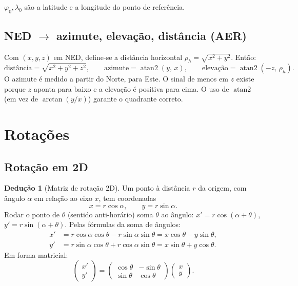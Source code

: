 \documentclass[11pt,a4paper]{article}
\theoremstyle{definition}
\newtheorem{deducao}{Dedução}[section]
\begin{document}
$\varphi_0,\lambda_0$ são a latitude e a longitude do ponto de referência.

\subsection{NED $\rightarrow$ azimute, elevação, distância (AER)}
Com $(x,y,z)$ em NED, define-se a distância horizontal $\rho_h=\sqrt{x^2+y^2}$. Então:
\[
\text{distância}=\sqrt{x^2+y^2+z^2},\qquad
\text{azimute}=\operatorname{atan2}(y,\,x),\qquad
\text{elevação}=\operatorname{atan2}(-z,\,\rho_h).
\]
O azimute é medido a partir do Norte, para Este. O sinal de menos em $z$ existe porque $z$ aponta para baixo e a elevação é positiva para cima. O uso de $\operatorname{atan2}$ (em vez de $\arctan(y/x)$) garante o quadrante correto.

\section{Rotações}

\subsection{Rotação em 2D}
\begin{deducao}[Matriz de rotação 2D]
Um ponto à distância $r$ da origem, com ângulo $\alpha$ em relação ao eixo $x$, tem coordenadas
\[
x=r\cos\alpha,\qquad y=r\sin\alpha .
\]
Rodar o ponto de $\theta$ (sentido anti-horário) soma $\theta$ ao ângulo: $x'=r\cos(\alpha+\theta)$, $y'=r\sin(\alpha+\theta)$. Pelas fórmulas da soma de ângulos:
\begin{align*}
x'&=r\cos\alpha\cos\theta-r\sin\alpha\sin\theta=x\cos\theta-y\sin\theta,\\
y'&=r\sin\alpha\cos\theta+r\cos\alpha\sin\theta=x\sin\theta+y\cos\theta .
\end{align*}
Em forma matricial:
\[
\begin{pmatrix}x'\\y'\end{pmatrix}=
\begin{pmatrix}\cos\theta&-\sin\theta\\\sin\theta&\cos\theta\end{pmatrix}
\begin{pmatrix}x\\y\end{pmatrix}.
\]
\end{deducao}
\end{document}
